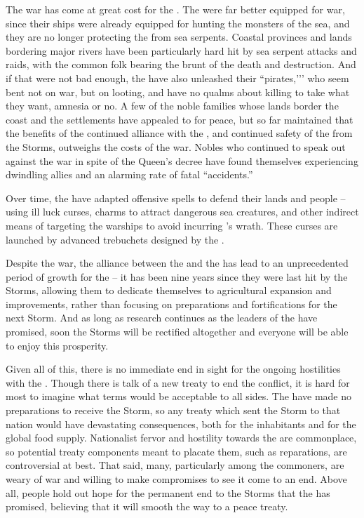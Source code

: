 \documentclass[blue]{GL2020}
\begin{document}
The war has come at great cost for the \pFarm{}. The \pShippies{} were far better equipped for war, since their ships were already equipped for hunting the monsters of the sea, and they are no longer protecting the \pFarm{} from sea serpents.  Coastal provinces and lands bordering major rivers have been particularly hard hit by sea serpent attacks and \pShip{} raids, with the common folk bearing the brunt of the death and destruction.  And if that were not bad enough, the \pShip{} have also unleashed their ``pirates,’’’ who seem bent not on war, but on looting, and have no qualms about killing to take what they want, amnesia or no.  A few of the noble families whose lands border the coast and the \pShip{} settlements have appealed to \cQueen{\Majesty} \cQueen{} for peace, but so far \cQueen{\they} \cQueen{\have} maintained that the benefits of the continued alliance with the \pTechies{}, and continued safety of the \pFarm{} from the Storms, outweighs the costs of the war.  Nobles who continued to speak out against the war in spite of the Queen’s decree have found themselves experiencing dwindling allies and an alarming rate of fatal ``accidents.'' 

Over time, the \pFarm{} have adapted offensive spells to defend their lands and people – using ill luck curses, charms to attract dangerous sea creatures, and other indirect means of targeting the warships to avoid incurring \cFarmGod{}’s wrath.  These curses are launched by advanced trebuchets designed by the \pTech{}.

Despite the war, the alliance between the \pFarm{} and the \pTech{} has lead to an unprecedented period of growth for the \pFarmers{} -- it has been nine years since they were last hit by the Storms, allowing them to dedicate themselves to agricultural expansion and improvements, rather than focusing on preparations and fortifications for the next Storm.  And as long as research continues as the leaders of the \pTech{} have promised, soon the Storms will be rectified altogether and everyone will be able to enjoy this prosperity. 

Given all of this, there is no immediate end in sight for the ongoing hostilities with the \pShip{}.  Though there is talk of a new treaty to end the conflict, it is hard for most to imagine what terms would be acceptable to all sides.  The \pFarm{} have made no preparations to receive the Storm, so any treaty which sent the Storm to that nation would have devastating consequences, both for the inhabitants and for the global food supply.  Nationalist fervor and hostility towards the \pShippies{} are commonplace, so potential treaty components meant to placate them, such as reparations, are controversial at best.  That said, many, particularly among the commoners, are weary of war and willing to make compromises to see it come to an end.  Above all, people hold out hope for the permanent end to the Storms that the \pTech{} has promised, believing that it will smooth the way to a peace treaty.
\end{document}
